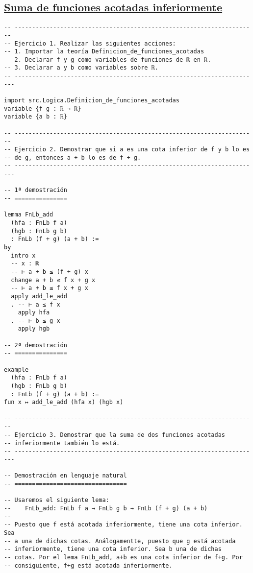 \subsection{\href{./src/Logica/Suma\_de\_funciones\_acotadas\_inferiormente.lean}{Suma de funciones acotadas inferiormente}}
\label{sec:org7e66664}
\begin{verbatim}
-- ---------------------------------------------------------------------
-- Ejercicio 1. Realizar las siguientes acciones:
-- 1. Importar la teoría Definicion_de_funciones_acotadas
-- 2. Declarar f y g como variables de funciones de ℝ en ℝ.
-- 3. Declarar a y b como variables sobre ℝ.
-- ----------------------------------------------------------------------

import src.Logica.Definicion_de_funciones_acotadas
variable {f g : ℝ → ℝ}
variable {a b : ℝ}

-- ---------------------------------------------------------------------
-- Ejercicio 2. Demostrar que si a es una cota inferior de f y b lo es
-- de g, entonces a + b lo es de f + g.
-- ----------------------------------------------------------------------

-- 1ª demostración
-- ===============

lemma FnLb_add
  (hfa : FnLb f a)
  (hgb : FnLb g b)
  : FnLb (f + g) (a + b) :=
by
  intro x
  -- x : ℝ
  -- ⊢ a + b ≤ (f + g) x
  change a + b ≤ f x + g x
  -- ⊢ a + b ≤ f x + g x
  apply add_le_add
  . -- ⊢ a ≤ f x
    apply hfa
  . -- ⊢ b ≤ g x
    apply hgb

-- 2ª demostración
-- ===============

example
  (hfa : FnLb f a)
  (hgb : FnLb g b)
  : FnLb (f + g) (a + b) :=
fun x ↦ add_le_add (hfa x) (hgb x)

-- ---------------------------------------------------------------------
-- Ejercicio 3. Demostrar que la suma de dos funciones acotadas
-- inferiormente también lo está.
-- ----------------------------------------------------------------------

-- Demostración en lenguaje natural
-- ================================

-- Usaremos el siguiente lema:
--    FnLb_add: FnLb f a → FnLb g b → FnLb (f + g) (a + b)
--
-- Puesto que f está acotada inferiormente, tiene una cota inferior. Sea
-- a una de dichas cotas. Análogamentte, puesto que g está acotada
-- inferiormente, tiene una cota inferior. Sea b una de dichas
-- cotas. Por el lema FnLb_add, a+b es una cota inferior de f+g. Por
-- consiguiente, f+g está acotada inferiormente.


\end{verbatim}
